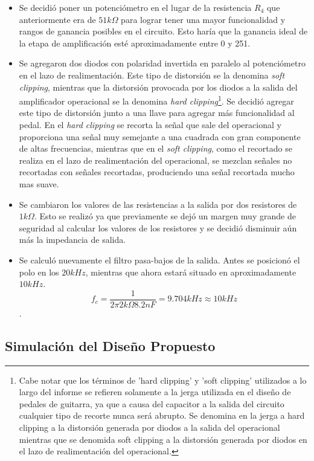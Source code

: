 \begin{itemize}
\item Se decidió poner un potenciómetro en el lugar de la resistencia $R_4$ que anteriormente era de $51k\Omega$ para lograr tener una mayor funcionalidad y rangos de ganancia posibles en el circuito. Esto haría que la ganancia ideal de la etapa de amplificación esté aproximadamente entre 0 y 251. 
\item Se agregaron dos diodos con polaridad invertida en paralelo al potenciómetro en el lazo de realimentación. Este tipo de distorsión se la denomina \textit{soft clipping}, mientras que la distorsión provocada por los diodos a la salida del amplificador operacional se la denomina \textit{hard clipping}\footnote{Cabe notar que los términos de 'hard clipping' y 'soft clipping' utilizados a lo largo del informe se refieren solamente a la jerga utilizada en el diseño de pedales de guitarra, ya que a causa del capacitor a la salida del circuito cualquier tipo de recorte nunca será abrupto. Se denomina en la jerga a hard clipping a la distorsión generada por diodos a la salida del operacional mientras que se denomida soft clipping a la distorsión generada por diodos en el lazo de realimentación del operacional.}. Se decidió agregar este tipo de distorsión junto a una llave para agregar más funcionalidad al pedal. En el \textit{hard clipping} se recorta la señal que sale del operacional y proporciona una señal muy semejante a una cuadrada con gran componente de altas frecuencias, mientras que en el \textit{soft clipping}, como el recortado se realiza en el lazo de realimentación del operacional, se mezclan señales no recortadas con señales recortadas, produciendo una señal recortada mucho mas suave.
\item Se cambiaron los valores de las resistencias a la salida por dos resistores de $1k\Omega$. Esto se realizó ya que previamente se dejó un margen muy grande de seguridad al calcular los valores de los resistores y se decidió disminuir aún más la impedancia de salida. 
\item Se calculó nuevamente el filtro pasa-bajos de la salida. Antes se posicionó el polo en los $20kHz$, mientras que ahora estará situado en  aproximadamente $10kHz$. $$ f_c = \frac{1}{2\pi 2k\Omega 8.2nF} = 9.704kHz \approx 10kHz$$.

\end{itemize}

\subsection{Simulación del Diseño Propuesto}

